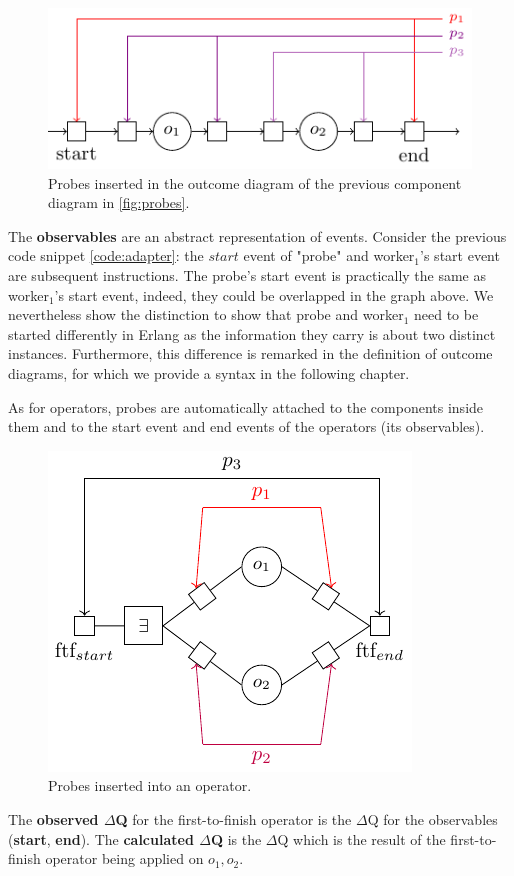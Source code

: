         \begin{figure}[H]
            \begin{center}
                \includegraphics[scale=1.3]{tikz/probe_1.pdf}
            \end{center}
            \label{fig:probes_o}
            \caption{Probes inserted in the outcome diagram of the previous component diagram in \cref{fig:probes}.}
        \end{figure}
       
    The \textbf{observables} are an abstract representation of events. Consider the previous code snippet \cref{code:adapter}: the $start$ event of "probe" and worker$_1$'s start event are subsequent instructions. The probe's start event is practically the same as worker$_1$'s start event, indeed, they could be overlapped in the graph above. We nevertheless show the distinction to show that probe and worker$_1$ need to be started differently in Erlang as the information they carry is about two distinct instances. Furthermore, this difference is remarked in the definition of outcome diagrams, for which we provide a syntax in the following chapter. 
    
    As for operators, probes are automatically attached to the components inside them and to the start event and end events of the operators (its observables). 

       \begin{figure}[H]
           \begin{center}
                \includegraphics[scale = 1.3]{tikz/probe_2.pdf}
            \end{center}
            \label{fig:probes_op}
            \caption{Probes inserted into an operator.}
       \end{figure}
    
    The \textbf{observed $\Delta$Q} for the first-to-finish operator is the $\Delta$Q for the observables (\textbf{start}, \textbf{end}). The \textbf{calculated $\Delta$Q} is the $\Delta$Q which is the result of the first-to-finish operator being applied on $o_1, o_2$.

        



